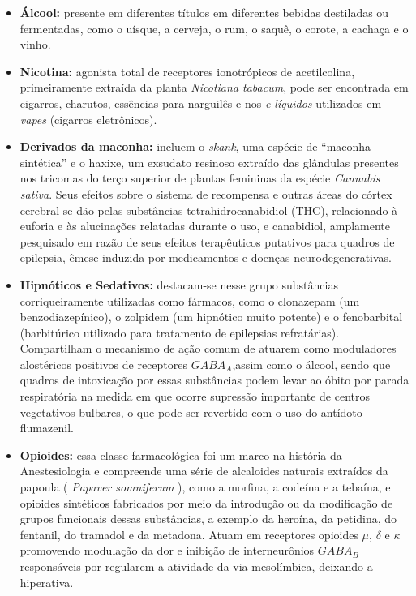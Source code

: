 \documentclass[
]{book}
\theoremstyle{definition}
\theoremstyle{definition}
\theoremstyle{definition}
\theoremstyle{definition}
\theoremstyle{remark}
\begin{document}
\begin{itemize}
\item
  \textbf{Álcool:} presente em diferentes títulos em diferentes bebidas destiladas ou fermentadas, como o uísque, a cerveja, o rum, o saquê, o corote, a cachaça e o vinho.
\item
  \textbf{Nicotina:} agonista total de receptores ionotrópicos de acetilcolina, primeiramente extraída da planta \emph{Nicotiana tabacum}, pode ser encontrada em cigarros, charutos, essências para narguilês e nos \emph{e-líquidos} utilizados em \emph{vapes} (cigarros eletrônicos).
\item
  \textbf{Derivados da maconha:} incluem o \emph{skank}, uma espécie de ``maconha sintética'' e o haxixe, um exsudato resinoso extraído das glândulas presentes nos tricomas do terço superior de plantas femininas da espécie \emph{Cannabis sativa}. Seus efeitos sobre o sistema de recompensa e outras áreas do córtex cerebral se dão pelas substâncias tetrahidrocanabidiol (THC), relacionado à euforia e às alucinações relatadas durante o uso, e canabidiol, amplamente pesquisado em razão de seus efeitos terapêuticos putativos para quadros de epilepsia, êmese induzida por medicamentos e doenças neurodegenerativas.
\item
  \textbf{Hipnóticos e Sedativos:} destacam-se nesse grupo substâncias corriqueiramente utilizadas como fármacos, como o clonazepam (um benzodiazepínico), o zolpidem (um hipnótico muito potente) e o fenobarbital (barbitúrico utilizado para tratamento de epilepsias refratárias). Compartilham o mecanismo de ação comum de atuarem como moduladores alostéricos positivos de receptores \(GABA_A\),assim como o álcool, sendo que quadros de intoxicação por essas substâncias podem levar ao óbito por parada respiratória na medida em que ocorre supressão importante de centros vegetativos bulbares, o que pode ser revertido com o uso do antídoto flumazenil.
\item
  \textbf{Opioides:} essa classe farmacológica foi um marco na história da Anestesiologia e compreende uma série de alcaloides naturais extraídos da papoula ( \emph{Papaver somniferum} ), como a morfina, a codeína e a tebaína, e opioides sintéticos fabricados por meio da introdução ou da modificação de grupos funcionais dessas substâncias, a exemplo da heroína, da petidina, do fentanil, do tramadol e da metadona. Atuam em receptores opioides \(\mu\), \(\delta\) e \(\kappa\) promovendo modulação da dor e inibição de interneurônios \(GABA_B\) responsáveis por regularem a atividade da via mesolímbica, deixando-a hiperativa.

\end{itemize}
\end{document}

